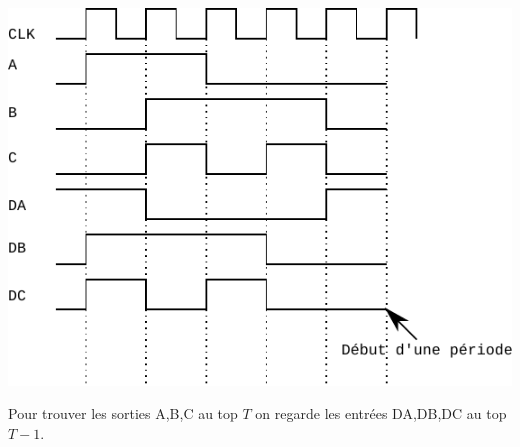 \documentclass[a4paper,10pt]{exam}
\begin{document}
\begin{enumerate}
    \begin{solution}
      \includegraphics{TD8-chrono}

      Pour trouver les sorties A,B,C au top $T$ on regarde les entrées DA,DB,DC
      au top $T-1$.
    \end{solution}

\end{enumerate}
\end{document}
